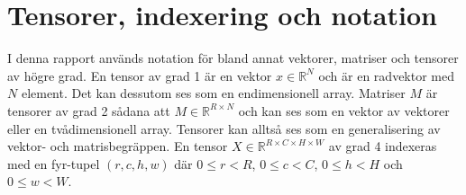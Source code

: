 \documentclass[a4paper,11pt,twoside]{article}
\newcommand*{\pd}[2]{\ensuremath{\dfrac{\partial #1}{\partial #2}}}
\begin{document}
\section{Tensorer, indexering och notation}
I denna rapport används notation för bland annat vektorer, matriser och tensorer av högre grad. En tensor av grad 1 är en vektor $x \in \mathbb{R}^N$ och är en radvektor med $N$ element. Det kan dessutom ses som en endimensionell array. Matriser $M$ är tensorer av grad 2 sådana att $M \in \mathbb{R}^{R \times N}$ och kan ses som en vektor av vektorer eller en tvådimensionell array. Tensorer kan alltså ses som en generalisering av vektor- och matrisbegräppen. En tensor $X \in \mathbb{R}^{R \times C \times H \times W}$ av grad 4 indexeras med en fyr-tupel $(r,c,h,w)$ där $0 \leq r < R$, $0 \leq c < C$, $0 \leq h < H$ och $0 \leq w < W$. 


%
\end{document}
